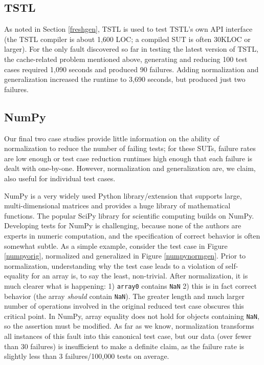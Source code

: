 \subsection{TSTL}

As noted in Section \ref{freshgen}, TSTL is used to test TSTL's own API
interface (the TSTL compiler is about 1,600 LOC; a compiled SUT is
often 30KLOC or larger).  For the only fault discovered so far in
testing the latest version of TSTL, the cache-related problem mentioned above, generating
and reducing 100 test cases required 1,090 seconds and produced 90 failures.  Adding normalization and generalization increased
the runtime to 3,690 seconds, but produced just two failures.

\subsection{NumPy}

Our final two case studies provide little information on the ability
of normalization to reduce the number of failing tests; for these
SUTs, failure rates are low enough or test case reduction runtimes high
enough that each failure is dealt with one-by-one.  However,
normalization and generalization are, we claim, also useful for
individual test cases.

NumPy \cite{NumPy} is a very widely used Python library/extension that
supports large, multi-dimensional matrices and provides a huge library
of mathematical functions.  The popular SciPy library for scientific
computing builds on NumPy.  Developing tests for NumPy is challenging,
because none of the authors are experts in numeric computation, and
the specification of correct behavior is often somewhat subtle.  As a
simple example, consider the test case in Figure \ref{numpyorig},
normalized and generalized in Figure \ref{numpynormgen}.  Prior to
normalization, understanding why the test case leads to a violation of
self-equality for an array is, to say the least, non-trivial.  After
normalization, it is much clearer what is happening: 1) {\tt array0}
contains {\tt NaN} 2) this is in fact correct behavior (the array
\emph{should} contain {\tt NaN}).  The greater length and much larger
number of operations involved in the original reduced test case
obscures this critical point.  In NumPy, array equality does not hold
for objects containing {\tt NaN}, so the assertion must be modified.
As far as we know, normalization transforms all instances of this
fault into this canonical test case, but our data (over fewer than 30
failures) is insufficient to make a definite claim, as the failure rate
is slightly less than 3 failures/100,000 tests on average.


